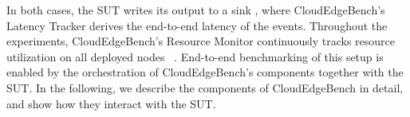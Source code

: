 \documentclass[runningheads]{llncs}
\newcommand*\circled[1]{%
  \tikz[baseline=(char.base)]{%
    \node[circle,draw,inner sep=0.6pt,font=\scriptsize] (char) {#1};%
  }%
}
\begin{document}
% 
In both cases, the SUT writes its output to a sink \circled{7}, where CloudEdgeBench's Latency Tracker derives the end-to-end latency of the events.
Throughout the experiments, CloudEdgeBench's Resource Monitor continuously tracks resource utilization on all deployed nodes~\circled{8}. 
End-to-end benchmarking of this setup is enabled by the orchestration of CloudEdgeBench's components together with the SUT.
In the following, we describe the components of CloudEdgeBench in detail, and show how they interact with the SUT. %







\end{document}
